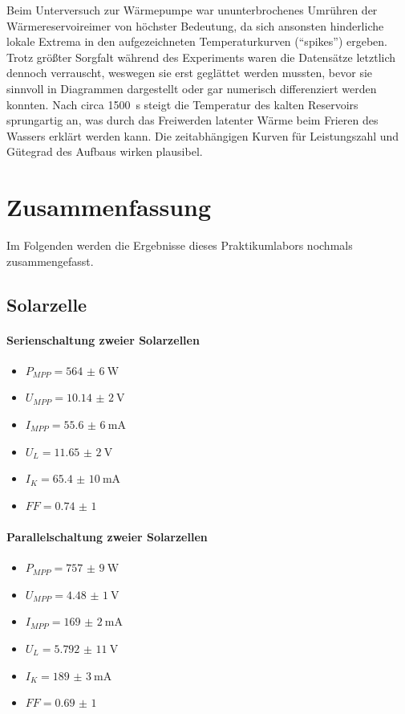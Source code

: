 \documentclass[english, ngerman]{scrartcl}
\begin{document}
Beim Unterversuch zur Wärmepumpe war ununterbrochenes Umrühren der Wärmereservoireimer von höchster Bedeutung, da sich ansonsten hinderliche lokale Extrema in den aufgezeichneten Temperaturkurven (\enquote{spikes}) ergeben. Trotz größter Sorgfalt während des Experiments waren die Datensätze letztlich dennoch verrauscht, weswegen sie erst geglättet werden mussten, bevor sie sinnvoll in Diagrammen dargestellt oder gar numerisch differenziert werden konnten. Nach circa \SI{1500}{s} steigt die Temperatur des kalten Reservoirs sprungartig an, was durch das Freiwerden latenter Wärme beim Frieren des Wassers erklärt werden kann. Die zeitabhängigen Kurven für Leistungszahl und Gütegrad des Aufbaus wirken plausibel.



\section{Zusammenfassung}
\label{sec:zusammenfassung}

Im Folgenden werden die Ergebnisse dieses Praktikumlabors nochmals zusammengefasst.


\subsection{Solarzelle}
\label{subsec:zusammenfassung_solar}

\paragraph{Serienschaltung zweier Solarzellen}
\begin{itemize}
    \item $P_{MPP} = \SI{564(6)}{\watt}$
    \item $U_{MPP} = \SI{10,14(2)}{\volt}$
    \item $I_{MPP} = \SI{55,6(6)}{\milli\ampere}$
    \item $U_{L} = \SI{11,65(2)}{\volt}$
    \item $I_{K} = \SI{65,4(10)}{\milli\ampere}$
    \item $FF = \num{0,74(1)}$
\end{itemize}

\paragraph{Parallelschaltung zweier Solarzellen}
\begin{itemize}
    \item $P_{MPP} = \SI{757(9)}{\watt}$
    \item $U_{MPP} = \SI{4,48(1)}{\volt}$
    \item $I_{MPP} = \SI{169(2)}{\milli\ampere}$
    \item $U_{L} = \SI{5,792(11)}{\volt}$
    \item $I_{K} = \SI{189(3)}{\milli\ampere}$
    \item $FF = \num{0,69(1)}$
\end{itemize}
\end{document}
